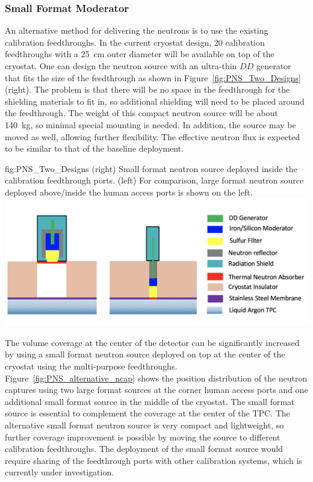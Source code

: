 \label{sec:sp-calib-pns-alt}

\subsubsection{Small Format Moderator}
An alternative method for delivering the neutrons is to use the existing calibration feedthroughs. In the current cryostat design, \num{20} calibration feedthroughs with a \SI{25}{\cm} outer diameter will be available on top of the cryostat. One can design the neutron source with an ultra-thin $DD$ generator that fits the size of the feedthrough as shown in Figure~\ref{fig:PNS_Two_Designs} (right). The problem is that there will be no space in the feedthrough for the shielding materials to fit in, so additional shielding will need to be placed around the feedthrough. The weight of this compact neutron source will be about \SI{140}{\kg}, so minimal special mounting is needed. In addition, the source may be moved as well, allowing further flexibility. The effective neutron flux is expected to be similar to that of the baseline deployment. 

\begin{dunefigure}{fig:PNS_Two_Designs}
{(right) Small format neutron source deployed inside the calibration feedthrough ports. (left) For comparison, large format neutron source deployed above/inside the human access ports is shown on the left.}
\includegraphics[width=16cm]{graphics/PNS_Moderator_Combined.png}
\end{dunefigure}

The volume coverage at the center of the detector can be significantly increased by using a small format neutron source deployed on top at the center of the cryostat using the multi-purpose feedthroughs.  
Figure~\ref{fig:PNS_alternative_ncap} shows the position distribution of the neutron captures using two large format sources at the corner human access ports and one additional small format source in the middle of the cryostat. The small format source is essential to complement the coverage at the center of the TPC. The alternative small format neutron source is very compact and lightweight, so further coverage improvement is possible by moving the source to different calibration feedthroughs. The deployment of the small format source would require sharing of the feedthrough ports with other calibration systems, which is currently under investigation.

